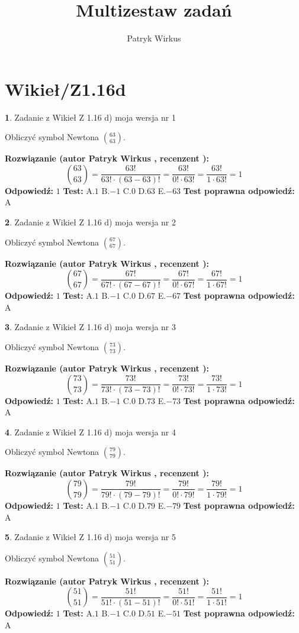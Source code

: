\documentclass[12pt, a4paper]{article}
\title{Multizestaw zadań}
\author{Patryk Wirkus}
\date{}
\theoremstyle{definition} %
\newtheorem{zad}{}
\newcommand{\kategoria}[1]{\section{#1}}
\newcommand{\zadStart}[1]{\begin{zad}#1\newline}
\newcommand{\zadStop}{\end{zad}}
\newcommand{\rozwStart}[2]{\noindent \textbf{Rozwiązanie (autor #1 , recenzent #2): }\newline}
\newcommand{\rozwStop}{\newline}
\newcommand{\odpStart}{\noindent \textbf{Odpowiedź:}\newline}
\newcommand{\odpStop}{\newline}
\newcommand{\testStart}{\noindent \textbf{Test:}\newline}
\newcommand{\testStop}{\newline}
\newcommand{\kluczStart}{\noindent \textbf{Test poprawna odpowiedź:}\newline}
\newcommand{\kluczStop}{\newline}
\begin{document}
\maketitle

\kategoria{Wikieł/Z1.16d}


\zadStart{Zadanie z Wikieł Z 1.16 d) moja wersja nr 1}

Obliczyć symbol Newtona ${63 \choose 63}$.
\zadStop
\rozwStart{Patryk Wirkus}{}
$${63 \choose 63} = \frac{63!}{63! \cdot (63-63)!} = \frac{63!}{0! \cdot 63!} = \frac{63!}{1 \cdot 63!} = 1$$
\rozwStop
\odpStart
$1$
\odpStop
\testStart
A.$1$ B.$-1$ C.$0$ D.$63$ E.$-63$
\testStop
\kluczStart
A
\kluczStop



\zadStart{Zadanie z Wikieł Z 1.16 d) moja wersja nr 2}

Obliczyć symbol Newtona ${67 \choose 67}$.
\zadStop
\rozwStart{Patryk Wirkus}{}
$${67 \choose 67} = \frac{67!}{67! \cdot (67-67)!} = \frac{67!}{0! \cdot 67!} = \frac{67!}{1 \cdot 67!} = 1$$
\rozwStop
\odpStart
$1$
\odpStop
\testStart
A.$1$ B.$-1$ C.$0$ D.$67$ E.$-67$
\testStop
\kluczStart
A
\kluczStop



\zadStart{Zadanie z Wikieł Z 1.16 d) moja wersja nr 3}

Obliczyć symbol Newtona ${73 \choose 73}$.
\zadStop
\rozwStart{Patryk Wirkus}{}
$${73 \choose 73} = \frac{73!}{73! \cdot (73-73)!} = \frac{73!}{0! \cdot 73!} = \frac{73!}{1 \cdot 73!} = 1$$
\rozwStop
\odpStart
$1$
\odpStop
\testStart
A.$1$ B.$-1$ C.$0$ D.$73$ E.$-73$
\testStop
\kluczStart
A
\kluczStop



\zadStart{Zadanie z Wikieł Z 1.16 d) moja wersja nr 4}

Obliczyć symbol Newtona ${79 \choose 79}$.
\zadStop
\rozwStart{Patryk Wirkus}{}
$${79 \choose 79} = \frac{79!}{79! \cdot (79-79)!} = \frac{79!}{0! \cdot 79!} = \frac{79!}{1 \cdot 79!} = 1$$
\rozwStop
\odpStart
$1$
\odpStop
\testStart
A.$1$ B.$-1$ C.$0$ D.$79$ E.$-79$
\testStop
\kluczStart
A
\kluczStop



\zadStart{Zadanie z Wikieł Z 1.16 d) moja wersja nr 5}

Obliczyć symbol Newtona ${51 \choose 51}$.
\zadStop
\rozwStart{Patryk Wirkus}{}
$${51 \choose 51} = \frac{51!}{51! \cdot (51-51)!} = \frac{51!}{0! \cdot 51!} = \frac{51!}{1 \cdot 51!} = 1$$
\rozwStop
\odpStart
$1$
\odpStop
\testStart
A.$1$ B.$-1$ C.$0$ D.$51$ E.$-51$
\testStop
\kluczStart
A
\kluczStop
\end{document}
